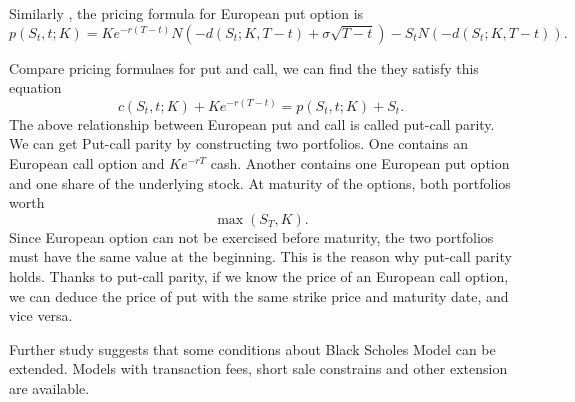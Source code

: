 \documentclass[12pt,oneside,titlepage]{book}
\begin{document}
Similarly , the pricing formula for European put option is
\begin{equation}
p(S_t, t;K)= Ke^{-r(T-t)}N(-d(S_t ; K,T-t) +\sigma \sqrt{T-t})-S_t N(-d(S_t;K,T-t)).
\end{equation}

Compare pricing formulaes for put and call, we can find the they satisfy this equation
\begin{equation}
c(S_t,t;K) + K e^{-r(T-t)} = p(S_t,t;K) + S_t.
\end{equation}
The above relationship between European put and call is called put-call parity. We can get Put-call parity by constructing two portfolios. One contains an European call option and $Ke^{-rT}$ cash. Another contains one European put option and one share of the underlying stock. At maturity of the options, both portfolios worth 
\begin{equation}
\max(S_T,K).
\end{equation}
Since European option can not be exercised before maturity, the two portfolios must have the same value at the beginning. This is the reason why put-call parity holds. Thanks to put-call parity, if we know the price of an European call option, we can deduce the price of put with the same strike price and maturity date, and vice versa.


Further study suggests that some conditions about Black Scholes Model can be extended. Models with transaction fees, short sale constrains and other extension are available.
%
\end{document}
